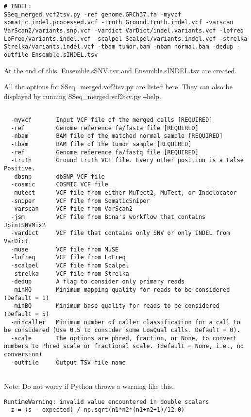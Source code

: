 \documentclass[10pt,letterpaper]{article}
\begin{document}
\begin{sloppypar}
\begin{lstlisting}
# INDEL:
SSeq_merged.vcf2tsv.py -ref genome.GRCh37.fa -myvcf somatic.indel.processed.vcf -truth Ground.truth.indel.vcf -varscan VarScan2/variants.snp.vcf -vardict VarDict/indel.variants.vcf -lofreq LoFreq/variants.indel.vcf -scalpel Scalpel/variants.indel.vcf -strelka Strelka/variants.indel.vcf -tbam tumor.bam -nbam normal.bam -dedup -outfile Ensemble.sINDEL.tsv
\end{lstlisting}


At the end of this, Ensemble.sSNV.tsv and Ensemble.sINDEL.tsv are created. 

All the options for SSeq\_merged.vcf2tsv.py are listed here. They can also be displayed by running SSeq\_merged.vcf2tsv.py \texttt{--}help.

\begin{lstlisting}

  -myvcf       Input VCF file of the merged calls [REQUIRED]
  -ref         Genome reference fa/fasta file [REQUIRED]
  -nbam        BAM file of the matched normal sample [REQUIRED]
  -tbam        BAM file of the tumor sample [REQUIRED]
  -ref         Genome reference fa/fastq file [REQUIRED]
  -truth       Ground truth VCF file. Every other position is a False Positive.
  -dbsnp       dbSNP VCF file
  -cosmic      COSMIC VCF file
  -mutect      VCF file from either MuTect2, MuTect, or Indelocator
  -sniper      VCF file from SomaticSniper
  -varscan     VCF file from VarScan2
  -jsm         VCF file from Bina's workflow that contains JointSNVMix2
  -vardict     VCF file that contains only SNV or only INDEL from VarDict
  -muse        VCF file from MuSE
  -lofreq      VCF file from LoFreq
  -scalpel     VCF file from Scalpel
  -strelka     VCF file from Strelka
  -dedup       A flag to consider only primary reads
  -minMQ       Minimum mapping quality for reads to be considered (Default = 1)
  -minBQ       Minimum base quality for reads to be considered (Default = 5)
  -mincaller   Minimum number of caller classification for a call to be considered (Use 0.5 to consider some LowQual calls. Default = 0).
  -scale       The options are phred, fraction, or None, to convert numbers to Phred scale or fractional scale. (default = None, i.e., no conversion)
  -outfile     Output TSV file name
                        
\end{lstlisting}


Note: Do not worry if Python throws a warning like this. 

\begin{lstlisting}
RuntimeWarning: invalid value encountered in double_scalars
  z = (s - expected) / np.sqrt(n1*n2*(n1+n2+1)/12.0)
\end{lstlisting}


\end{sloppypar}
\end{document}
